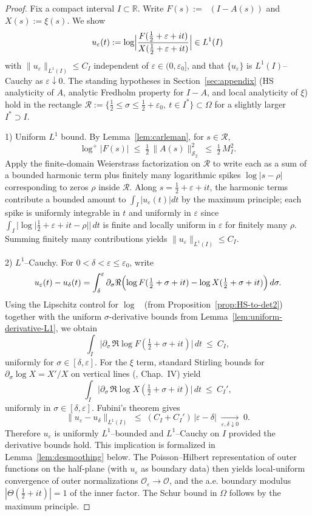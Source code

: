 \documentclass[11pt]{article}
\theoremstyle{definition}
\theoremstyle{remark}
\newcommand{\R}{\mathbb{R}}
\newcommand{\HS}{\mathcal{S}_2}
\DeclareMathOperator{\dettwo}{det_2}
\begin{document}
\begin{proof}
Fix a compact interval $I\subset\R$. Write $F(s):=\dettwo(I-A(s))$ and $X(s):=\xi(s)$. We show
\[
 u_\varepsilon(t):=\log\Bigl|\frac{F(\tfrac12+\varepsilon+it)}{X(\tfrac12+\varepsilon+it)}\Bigr|\in L^1(I)
\]
with $\|u_\varepsilon\|_{L^1(I)}\le C_I$ independent of \(\varepsilon\in(0,\varepsilon_0]\), and that \(\{u_\varepsilon\}\) is $L^1(I)$–Cauchy as \(\varepsilon\downarrow 0\). The standing hypotheses in Section~\ref{sec:appendix} (HS analyticity of $A$, analytic Fredholm property for $I-A$, and local analyticity of \(\xi\)) hold in the rectangle \(\mathcal R:=\{\tfrac12\le\sigma\le\tfrac12+\varepsilon_0,\ t\in I^{\!*}\}\subset\Omega\) for a slightly larger \(I^{\!*}\supset I\).

1) Uniform $L^1$ bound. By Lemma~\ref{lem:carleman}, for \(s\in\mathcal R\),
\[
 \log^+|F(s)|\;\le\;\tfrac12\,\|A(s)\|_{\HS}^2\;\le\;\tfrac12\,M_I^2.
\]
Apply the finite-domain Weierstrass factorization on \(\mathcal R\) to write each as a sum of a bounded harmonic term plus finitely many logarithmic spikes \(\log|s-\rho|\) corresponding to zeros \(\rho\) inside \(\mathcal R\). Along \(s=\tfrac12+\varepsilon+it\), the harmonic terms contribute a bounded amount to \(\int_I |u_\varepsilon(t)|dt\) by the maximum principle; each spike is uniformly integrable in \(t\) and uniformly in \(\varepsilon\) since \(\int_I |\log|\tfrac12+\varepsilon+it-\rho||\,dt\) is finite and locally uniform in \(\varepsilon\) for finitely many \(\rho\). Summing finitely many contributions yields $\|u_\varepsilon\|_{L^1(I)}\le C_I$.

2) $L^1$–Cauchy. For \(0<\delta<\varepsilon\le\varepsilon_0\), write
\[
 u_\varepsilon(t)-u_\delta(t)
 = \int_{\delta}^{\varepsilon} \partial_\sigma \Re\Bigl(\log F(\tfrac12+\sigma+it)-\log X(\tfrac12+\sigma+it)\Bigr)\,d\sigma.
\]
Using the Lipschitz control for \(\log\dettwo\) (from Proposition~\ref{prop:HS-to-det2}) together with the uniform \(\sigma\)-derivative bounds from Lemma~\ref{lem:uniform-derivative-L1}, we obtain
\[
 \int_I\bigl|\partial_\sigma\,\Re\log F(\tfrac12+\sigma+it)\bigr|\,dt\ \le\ C_I,
\]
uniformly for \(\sigma\in[\delta,\varepsilon]\). For the \(\xi\) term, standard Stirling bounds for \(\partial_\sigma\log X= X'/X\) on vertical lines (\cite{TitchmarshZeta}, Chap.~IV) yield
\[
  \int_I\bigl|\partial_\sigma\,\Re\log X(\tfrac12+\sigma+it)\bigr|\,dt\ \le\ C_I',
\]
uniformly in \(\sigma\in[\delta,\varepsilon]\). Fubini's theorem gives
\[
 \|u_\varepsilon-u_\delta\|_{L^1(I)}\;\le\;(C_I+C_I')\,|\varepsilon-\delta|\;\xrightarrow[\varepsilon,\delta\downarrow 0]{}\;0.
\]
Therefore \(u_\varepsilon\) is uniformly $L^1$–bounded and $L^1$–Cauchy on \(I\) provided the derivative bounds hold. This implication is formalized in Lemma~\ref{lem:desmoothing} below. The Poisson–Hilbert representation of outer functions on the half-plane (with \(u_\varepsilon\) as boundary data) then yields local-uniform convergence of outer normalizations \(\mathcal O_\varepsilon\to \mathcal O\), and the a.e. boundary modulus \(|\Theta(\tfrac12+it)|=1\) of the inner factor. The Schur bound in \(\Omega\) follows by the maximum principle.
\end{proof}
\end{document}
